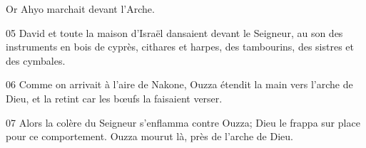
 Or Ahyo marchait devant l’Arche.

05 David et toute la maison d’Israël dansaient devant le Seigneur, au son des instruments en bois de cyprès, cithares et harpes, des tambourins, des sistres et des cymbales.

06 Comme on arrivait à l’aire de Nakone, Ouzza étendit la main vers l’arche de Dieu, et la retint car les bœufs la faisaient verser.

07 Alors la colère du Seigneur s’enflamma contre Ouzza; Dieu le frappa sur place pour ce comportement. Ouzza mourut là, près de l’arche de Dieu.
